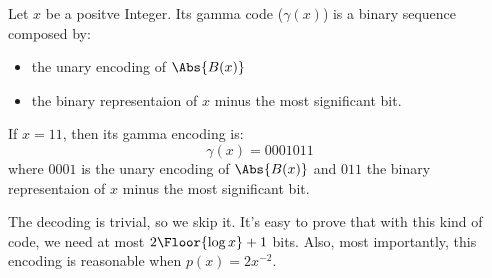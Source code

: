 \documentclass{subfiles}
\begin{document}
    Let \(x\) be a positve Integer.
        Its gamma code (\(\gamma(x)\)) is a binary sequence composed by:
        \begin{itemize}
            \item the unary encoding of \(\Abs{B(x)}\)
            \item the binary representaion of \(x\) minus the most significant bit.
        \end{itemize}

    \begin{example*}
        If \(x = 11\), then its gamma encoding is:
            \[
                \gamma(x) = 0001011
            \]
        where \(0001\) is the unary encoding of \(\Abs{B(x)}\) and \(011\)
        the binary representaion of \(x\) minus the most significant bit.
    \end{example*}

    The decoding is trivial, so we skip it.
    It's easy to prove that with this kind of code, we need at most \(2 \Floor{\log x} + 1\)
    bits. Also, most importantly, this encoding is reasonable when \(p(x) = 2x^{-2}\).
\end{document}
